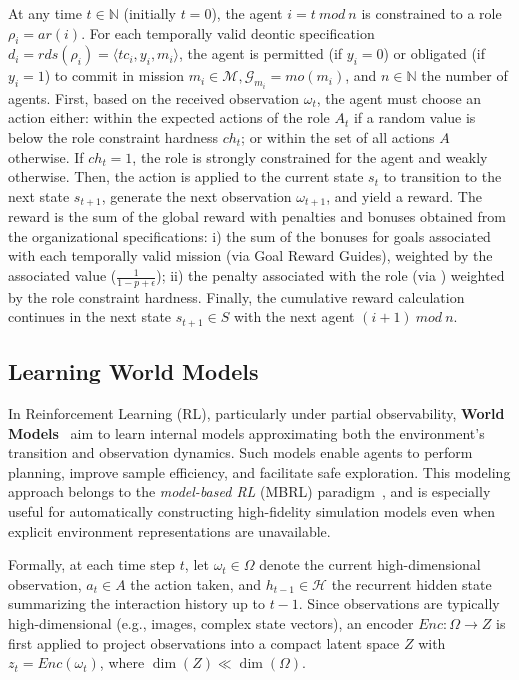 \documentclass[pdflatex,sn-mathphys-num]{sn-jnl}%
\theoremstyle{thmstyleone}%
\theoremstyle{thmstyletwo}%
\theoremstyle{thmstylethree}%
\begin{document}
At any time $t \in \mathbb{N}$ (initially $t = 0$), the agent $i = t \ mod \ n$ is constrained to a role $\rho_i = ar(i)$. For each temporally valid deontic specification $d_i = rds(\rho_i) = \langle tc_i,y_i, m_i \rangle$, the agent is permitted (if $y_i = 0$) or obligated (if $y_i = 1$) to commit in mission $m_i \in \mathcal{M}, \mathcal{G}_{m_i} = mo(m_i)$, and $n \in \mathbb{N}$ the number of agents.
%
First, based on the received observation $\omega_t$, the agent must choose an action either: within the expected actions of the role $A_t$ if a random value is below the role constraint hardness $ch_t$; or within the set of all actions $A$ otherwise. If $ch_t = 1$, the role is strongly constrained for the agent and weakly otherwise.
%
Then, the action is applied to the current state $s_t$ to transition to the next state $s_{t+1}$, generate the next observation $\omega_{t+1}$, and yield a reward. The reward is the sum of the global reward with penalties and bonuses obtained from the organizational specifications: \quad i) the sum of the bonuses for goals associated with each temporally valid mission (via Goal Reward Guides), weighted by the associated value ($\frac{1}{1-p+\epsilon}$); \quad ii) the penalty associated with the role (via ) weighted by the role constraint hardness.
%
Finally, the cumulative reward calculation continues in the next state $s_{t+1} \in S$ with the next agent $(i+1) \ mod \ n$.


\subsection{Learning World Models}

In Reinforcement Learning (RL), particularly under partial observability, \textbf{World Models}~\cite{ha2018recurrent, hafner2020dream} aim to learn internal models approximating both the environment's transition and observation dynamics. Such models enable agents to perform planning, improve sample efficiency, and facilitate safe exploration. This modeling approach belongs to the \textit{model-based RL} (MBRL) paradigm~\cite{moerland2020model}, and is especially useful for automatically constructing high-fidelity simulation models even when explicit environment representations are unavailable.

Formally, at each time step $t$, let $\omega_t \in \Omega$ denote the current high-dimensional observation, $a_t \in A$ the action taken, and $h_{t-1} \in \mathcal{H}$ the recurrent hidden state summarizing the interaction history up to $t-1$. Since observations are typically high-dimensional (e.g., images, complex state vectors), an encoder $Enc: \Omega \rightarrow Z$ is first applied to project observations into a compact latent space $Z$ with $z_t = Enc(\omega_t)$, where $\dim(Z) \ll \dim(\Omega)$.
\end{document}
